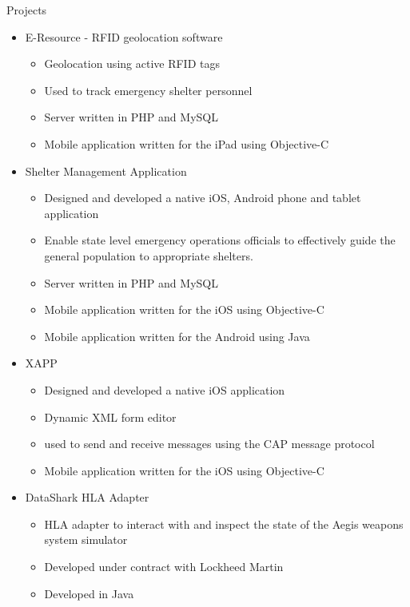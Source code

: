 \documentclass{res}
\begin{document}
\begin{resume}
    Projects
    \begin{itemize}
        \item E-Resource - RFID geolocation software
        \begin{itemize}
            \item Geolocation using active RFID tags
            \item Used to track emergency shelter personnel
            \item Server written in PHP and MySQL
            \item Mobile application written for the iPad using Objective-C
        \end{itemize}
        \item Shelter Management Application
        \begin{itemize}
            \item Designed and developed a native iOS, Android phone and tablet application
            \item Enable state level emergency operations officials to effectively guide the general population to appropriate shelters.
            \item Server written in PHP and MySQL
            \item Mobile application written for the iOS using Objective-C
            \item Mobile application written for the Android using Java
        \end{itemize}
        \item XAPP
        \begin{itemize}
            \item Designed and developed a native iOS application
            \item Dynamic XML form editor
            \item used to send and receive messages using the CAP message protocol
            \item Mobile application written for the iOS using Objective-C
        \end{itemize}
        \item DataShark HLA Adapter
        \begin{itemize}
            \item HLA adapter to interact with and inspect the state of the Aegis weapons system simulator
            \item Developed under contract with Lockheed Martin
            \item Developed in Java
        \end{itemize}
    \end{itemize}



\end{resume}
\end{document}
